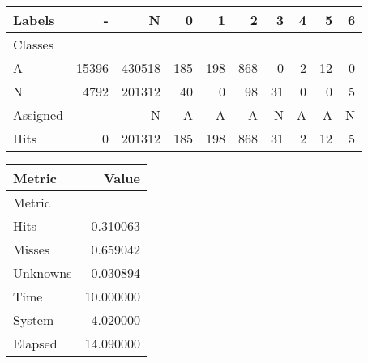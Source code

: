 \begin{tabular}{l|r|r|r|r|r|r|r|r|r}

Labels &      - &       N &    0 &    1 &    2 &   3 &  4 &   5 &  6 \\\hline
Classes  &        &         &      &      &      &     &    &     &    \\\hline
\hline
A        &  15396 &  430518 &  185 &  198 &  868 &   0 &  2 &  12 &  0 \\\hline
N        &   4792 &  201312 &   40 &    0 &   98 &  31 &  0 &   0 &  5 \\\hline
\hline
Assigned &      - &       N &    A &    A &    A &   N &  A &   A &  N \\\hline
Hits     &      0 &  201312 &  185 &  198 &  868 &  31 &  2 &  12 &  5 
\end{tabular}
\begin{tabular}{l|r}

Metric   &      Value \\\hline
Metric   &            \\\hline
\hline
Hits     &   0.310063 \\\hline
Misses   &   0.659042 \\\hline
Unknowns &   0.030894 \\\hline
Time     &  10.000000 \\\hline
System   &   4.020000 \\\hline
Elapsed  &  14.090000 
\end{tabular}
